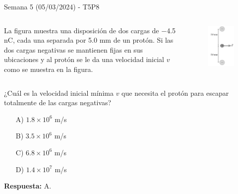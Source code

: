\begin{frame}{Semana 5 (05/03/2024) - T5P8}

        \begin{columns}
        La figura muestra una disposición de dos cargas de $-$4.5 nC, cada una separada por 5.0 mm de un protón. Si las dos cargas negativas se mantienen fijas en sus ubicaciones y al protón se le da una velocidad inicial $v$ como se muestra en la figura.
        \begin{figure}
        \centering
        \includegraphics[scale=0.3]{figures/t5p7.png}
        \end{figure}
        \end{columns}
        
        \vspace{1em}
        
        ¿Cuál es la velocidad inicial mínima $v$ que necesita el protón para escapar totalmente de las cargas negativas?
        
        \begin{itemize}
        \item[A)] $1.8 \times 10^6$ m/s
        \item[B)] $3.5 \times 10^6$ m/s
        \item[C)] $6.8 \times 10^6$ m/s
        \item[D)] $1.4 \times 10^7$ m/s
        \end{itemize}
        
        \pause \centering \textbf{Respuesta:} A.
        
    \end{frame}

